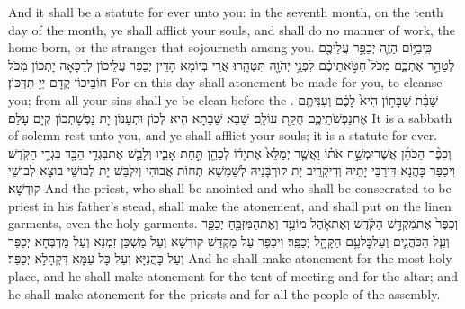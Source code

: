 {And it shall be a statute for ever unto you: in the seventh month, on the tenth day of the month, ye shall afflict your souls, and shall do no manner of work, the home-born, or the stranger that sojourneth among you.}{}
{כִּֽי\maqqaf בַיּ֥וֹם הַזֶּ֛ה יְכַפֵּ֥ר עֲלֵיכֶ֖ם לְטַהֵ֣ר אֶתְכֶ֑ם מִכֹּל֙ חַטֹּ֣אתֵיכֶ֔ם לִפְנֵ֥י יְהֹוָ֖ה תִּטְהָֽרוּ׃}
{אֲרֵי בְּיוֹמָא הָדֵין יְכַפַּר עֲלֵיכוֹן לְדַכָּאָה יָתְכוֹן מִכֹּל חוֹבֵיכוֹן קֳדָם יְיָ תִּדְכּוֹן׃}
{For on this day shall atonement be made for you, to cleanse you; from all your sins shall ye be clean before the \lord.}{}
{שַׁבַּ֨ת שַׁבָּת֥וֹן הִיא֙ לָכֶ֔ם וְעִנִּיתֶ֖ם אֶת\maqqaf נַפְשֹׁתֵיכֶ֑ם חֻקַּ֖ת עוֹלָֽם׃}
{שַׁבָּא שַׁבָּתָא הִיא לְכוֹן וּתְעַנּוֹן יָת נַפְשָׁתְכוֹן קְיָם עָלַם׃}
{It is a sabbath of solemn rest unto you, and ye shall afflict your souls; it is a statute for ever.}{}
{וְכִפֶּ֨ר הַכֹּהֵ֜ן אֲשֶׁר\maqqaf יִמְשַׁ֣ח אֹת֗וֹ וַאֲשֶׁ֤ר יְמַלֵּא֙ אֶת\maqqaf יָד֔וֹ לְכַהֵ֖ן תַּ֣חַת אָבִ֑יו וְלָבַ֛שׁ אֶת\maqqaf בִּגְדֵ֥י הַבָּ֖ד בִּגְדֵ֥י הַקֹּֽדֶשׁ׃}
{וִיכַפַּר כָּהֲנָא דִּירַבֵּי יָתֵיהּ וְדִיקָרֵיב יָת קוּרְבָּנֵיהּ לְשַׁמָּשָׁא תְּחוֹת אֲבוּהִי וְיִלְבַּשׁ יָת לְבוּשֵׁי בוּצָא לְבוּשֵׁי קוּדְשָׁא׃}
{And the priest, who shall be anointed and who shall be consecrated to be priest in his father’s stead, shall make the atonement, and shall put on the linen garments, even the holy garments.}{}
{וְכִפֶּר֙ אֶת\maqqaf מִקְדַּ֣שׁ הַקֹּ֔דֶשׁ וְאֶת\maqqaf אֹ֧הֶל מוֹעֵ֛ד וְאֶת\maqqaf הַמִּזְבֵּ֖חַ יְכַפֵּ֑ר וְעַ֧ל הַכֹּהֲנִ֛ים וְעַל\maqqaf כׇּל\maqqaf עַ֥ם הַקָּהָ֖ל יְכַפֵּֽר׃}
{וִיכַפַּר עַל מַקְדַּשׁ קוּדְשָׁא וְעַל מַשְׁכַּן זִמְנָא וְעַל מַדְבְּחָא יְכַפַּר וְעַל כָּהֲנַיָּא וְעַל כָּל עַמָּא דִּקְהָלָא יְכַפַּר׃}
{And he shall make atonement for the most holy place, and he shall make atonement for the tent of meeting and for the altar; and he shall make atonement for the priests and for all the people of the assembly.}{}
